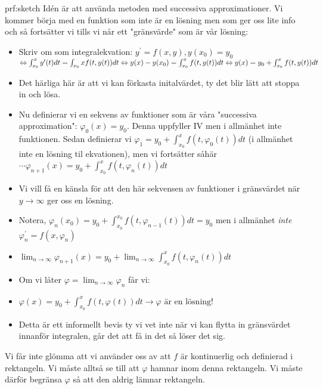\begin{prf}{prf:sketch}
  Idén är att använda metoden med successiva approximationer. Vi kommer börja med en funktion som inte är en lösning men som ger oss lite info och så fortsätter vi tills vi når ett "gränsvärde" som är vår lösning:

  \begin{itemize}
    \item Skriv om som integralekvation: $y^{\prime}=f(x,y), y(x_0)=y_0$ $\Leftrightarrow\int_{x_0}^{x}y^{\prime}(t)dt=\int_{x_0}{x}f(t,y(t))dt \Leftrightarrow y(x)-y(x_0)=\int_{x_0}^{x}f(t,y(t))dt \Leftrightarrow y(x)=y_0+\int_{x_0}^{x}f(t,y(t))dt$
    \item Det härliga här är att vi kan förkasta initalvärdet, ty det blir lätt att stoppa in och lösa.
    \item Nu definierar vi en sekvens av funktioner som är våra "successiva approximation": $\varphi_0(x)=y_0$. Denna uppfyller IV men i allmänhet inte funktionen. Sedan definierar vi $\varphi_1=y_0+\int_{x_0}^{x}f(t,\varphi_0(t))dt$ (i allmänhet inte en lösning til ekvationen), men vi fortsätter såhär $\cdots \varphi_{n+1}(x)=y_0+\int_{x_0}^{x}f(t,\varphi_n(t))dt$
    \item Vi vill få en känsla för att den här sekvensen av funktioner i gränsvärdet när $y\to\infty$ ger oss en lösning.
    \item Notera, $\varphi_n(x_0)=y_0+\int_{x_0}^{x_0}f(t,\varphi_{n-1}(t))dt=y_0$ men i allmänhet \textit{inte} $\varphi_n^{\prime}=f(x,\varphi_n)$
    \item $\lim_{n\to\infty}\varphi_{n+1}(x)=y_0+\lim_{n\to\infty}\int_{x_0}^{x}f(t,\varphi_n(t))dt$
    \item Om vi låter $\varphi=\lim_{n\to\infty}\varphi_n$ får vi:
    \item $\varphi(x)=y_0+\int_{x_0}^{x}f(t,\varphi(t))dt \to \varphi \text{ är en lösning!}$
    \item Detta är ett informellt bevis ty vi vet inte när vi kan flytta in gränsvärdet innanför integralen, går det att få in det så löser det sig.
  \end{itemize}
  \par\bigskip

  \noindent Vi får inte glömma att vi använder oss av att $f$ är kontinuerlig och definierad i rektangeln. Vi måste alltså se till att $\varphi$ hamnar inom denna rektangeln. Vi måste därför begränsa $\varphi$ så att den aldrig lämnar rektangeln.
  \par\bigskip

\end{prf}

